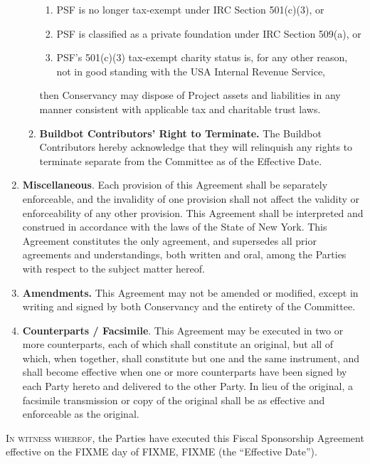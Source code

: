 \documentclass[letterpaper,12pt]{article}
\begin{document}
\begin{enumerate}[label=\arabic*.,ref=\S~\arabic*]
\begin{enumerate}[label=\alph*.,ref=\theenumi(\arabic*)]
\begin{enumerate}[label=\roman*.,ref=\theenumi(\alph{enumii})(\roman*)]

\item PSF is no longer tax-exempt under IRC Section 501(c)(3), or

\item PSF is classified as a private foundation under IRC Section 509(a), or

\item PSF's 501(c)(3) tax-exempt charity status is, for any other reason, not
  in good standing with the USA Internal Revenue Service,
\end{enumerate}
then
Conservancy may dispose of Project assets and liabilities
in any manner consistent with applicable tax and charitable trust
laws. 
\item \textbf{Buildbot Contributors' Right to Terminate.} 
The Buildbot Contributors hereby acknowledge that they will relinquish any
       rights to terminate separate from the Committee as
       of the Effective Date.
\end{enumerate}
\item \textbf{Miscellaneous}. Each provision of this Agreement shall be
separately enforceable, and the invalidity of one provision shall
not affect the validity or enforceability of any other provision.
This Agreement shall be interpreted and construed in accordance with
the laws of the State of New York. This Agreement constitutes the
only agreement, and supersedes all prior agreements and understandings,
both written and oral, among the Parties with respect to the subject
matter hereof. 
\item \textbf{Amendments. }This Agreement may not be amended or modified,
except in writing and signed by both Conservancy and the entirety of the Committee. 
\item \textbf{Counterparts / Facsimile}. This Agreement may be executed
in two or more counterparts, each of which shall constitute an original,
but all of which, when together, shall constitute but one and the
same instrument, and shall become effective when one or more counterparts
have been signed by each Party hereto and delivered to the other Party.
In lieu of the original, a facsimile transmission or copy of the original
shall be as effective and enforceable as the original. 
\end{enumerate}
\vfill{}


\textsc{In witness whereof}, the Parties have executed this Fiscal
Sponsorship Agreement effective on the FIXME day of FIXME, FIXME (the
``Effective Date'').
\end{document}
